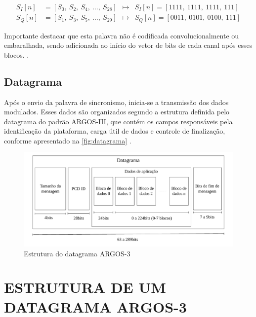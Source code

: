 \vspace{-1em}
\begin{equation}
\begin{aligned}
    S_I[n] &= [S_0,\ S_2,\ S_4,\ \dots,\ S_{28}] &\mapsto&  S_I[n] = [1111,\ 1111,\ 1111,\ 111]     \\
    S_Q[n] &= [S_1,\ S_3,\ S_5,\ \dots,\ S_{29}] &\mapsto&  S_Q[n] = [0011,\ 0101,\ 0100,\ 111]
\end{aligned}
\label{eq:intercalacao}
\end{equation}

\noindent Importante destacar que esta palavra não é codificada convolucionalmente ou embaralhada, sendo adicionada ao início do vetor de bits de cada canal após esses blocos.  \cite{cnes_services_and_message_formats_ed2_rev2_2006}. 

\subsection{Datagrama}

Após o envio da palavra de sincronismo, inicia-se a transmissão dos dados modulados. Esses dados são organizados segundo a estrutura definida pelo datagrama do padrão \gls{ARGOS-III}, que contém os campos responsáveis pela identificação da plataforma, carga útil de dados e controle de finalização, conforme apresentado na \autoref{fig:datagrama} \cite{cnes_services_and_message_formats_ed2_rev2_2006}.

\begin{figure}[ht]
	\centering
	\caption{Estrutura do datagrama ARGOS-3}\label{fig:datagrama}
	\includegraphics[width=\linewidth]{assets/datagrama.pdf}
    
\end{figure}

\section{ESTRUTURA DE UM DATAGRAMA ARGOS-3}

